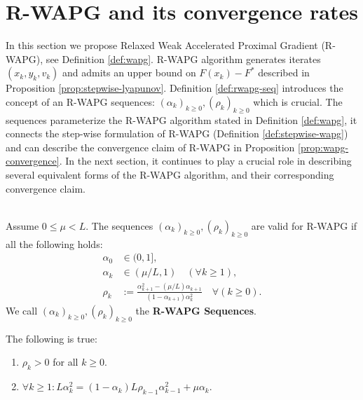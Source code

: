 \documentclass[12pt]{article}
\begin{document}
\section{R-WAPG and its convergence rates}\label{sec:rwapg-formulation-convergence}
    In this section we propose Relaxed Weak Accelerated Proximal Gradient (R-WAPG), see Definition \ref{def:wapg}.
    R-WAPG algorithm generates iterates $(x_k, y_k, v_k)$ and admits an upper bound on $F(x_k) - F^*$ described in Proposition \ref{prop:stepwise-lyapunov}. 
    Definition \ref{def:rwapg-seq} introduces the concept of an R-WAPG sequences: $(\alpha_k)_{k \ge 0}, (\rho_k)_{k \ge 0}$ which is crucial.
    The sequences parameterize the R-WAPG algorithm stated in Definition \ref{def:wapg}, it connects the step-wise formulation of R-WAPG (Definition \ref{def:stepwise-wapg}) and can describe the convergence claim of R-WAPG in Proposition \ref{prop:wapg-convergence}. 
    In the next section, it continues to play a crucial role in describing several equivalent forms of the R-WAPG algorithm, and their corresponding convergence claim. 
    \begin{definition}\label{def:rwapg-seq}\;\\
        Assume $0 \le \mu < L$. 
        The sequences $(\alpha_k)_{k \ge 0}, (\rho_k)_{k \ge 0}$ are valid for R-WAPG if all the following holds: 
        \begin{align*}
            \alpha_0 &\in (0, 1], 
            \\
            \alpha_k &\in (\mu/L, 1) \quad (\forall k \ge 1), 
            \\
            \rho_k &:= \frac{\alpha_{k + 1}^2 - (\mu/L)\alpha_{k + 1}}{(1 - \alpha_{k + 1})\alpha_k^2} \quad \forall (k \ge 0). 
        \end{align*}
        We call $(\alpha_k)_{k \ge 0}, (\rho_k)_{k \ge 0}$ the \textbf{R-WAPG Sequences}. 
    \end{definition}
    \begin{observation}\label{obs:r-wapg-observation-1}
        The following is true: 
        \begin{enumerate}
            \item $\rho_k > 0$ for all $k \ge 0$. 
            \item $\forall k \ge 1: L\alpha_k^2 = (1 - \alpha_k)L\rho_{k - 1}\alpha_{k - 1}^2 +\mu\alpha_k$. 
        \end{enumerate}
        
    \end{observation}
\end{document}
